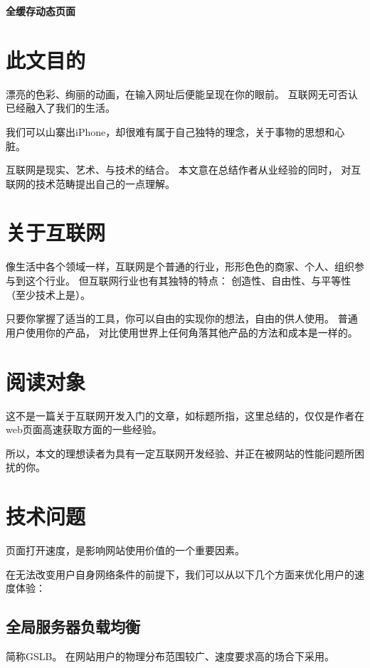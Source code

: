 \documentclass{article}
\begin{document}
  \begin{center}
    \huge \bf  全缓存动态页面
  \end{center}

  \tableofcontents
  \newpage
  
  \section{此文目的}
  漂亮的色彩、绚丽的动画，在输入网址后便能呈现在你的眼前。 互联网无可否认已经融入了我们的生活。

  我们可以山寨出iPhone，却很难有属于自己独特的理念，关于事物的思想和心脏。

  互联网是现实、艺术、与技术的结合。 本文意在总结作者从业经验的同时，
  对互联网的技术范畴提出自己的一点理解。

  
  \section{关于互联网}
  像生活中各个领域一样，互联网是个普通的行业，形形色色的商家、个人、组织参与到这个行业。
  但互联网行业也有其独特的特点： 创造性、自由性、与平等性（至少技术上是）。

  只要你掌握了适当的工具，你可以自由的实现你的想法，自由的供人使用。 普通用户使用你的产品，
  对比使用世界上任何角落其他产品的方法和成本是一样的。
  

  \section{阅读对象}
  这不是一篇关于互联网开发入门的文章，如标题所指，这里总结的，仅仅是作者在web页面高速获取方面的一些经验。

  所以，本文的理想读者为具有一定互联网开发经验、并正在被网站的性能问题所困扰的你。

  \section{技术问题}

  页面打开速度，是影响网站使用价值的一个重要因素。

  在无法改变用户自身网络条件的前提下，我们可以从以下几个方面来优化用户的速度体验：

  \subsection{全局服务器负载均衡}

  简称GSLB。 在网站用户的物理分布范围较广、速度要求高的场合下采用。
\end{document}
